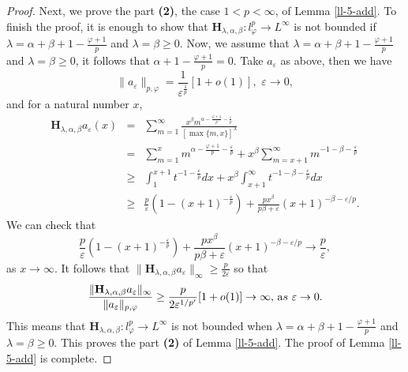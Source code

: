 \documentclass[10pt,a4paper]{amsart}
\begin{document}
\begin{proof}
Next, we prove the part {\bf (2)}, the case $1<p<\infty$, of Lemma \ref{ll-5-add}.  
To finish the proof, it is enough to show that $\mathbf{H}_{\lambda, \alpha, \beta}: l_{\varphi}^p \rightarrow L^{\infty}$ is not bounded if $\lambda=\alpha+\beta+1-\frac{\varphi+1}{p}$ and $\lambda=\beta\geq 0$. Now, we assume that
$\lambda=\alpha+\beta+1-\frac{\varphi+1}{p}$ and $\lambda=\beta\geq 0$, it follows that $\alpha+1-\frac{\varphi+1}{p}=0$.  Take $a_{\varepsilon}$ as above, then we have 
$$\|a_{\varepsilon}\|_{p, \varphi}=\frac{1}{{\varepsilon}^{\frac{1}{p}}}[1+o(1)],\,\, \varepsilon \rightarrow 0,$$ 
and for a natural number $x$,
 \begin{eqnarray}
\mathbf{H}_{\lambda, \alpha, \beta}a_{\varepsilon}(x)&=&\sum_{m=1}^{\infty}\frac{x^{\beta}m^{\alpha-\frac{\varphi+1}{p}-\frac{\varepsilon}{p}}}{[\max\{m,x\}]^{\lambda}}
\nonumber \\
&=&\sum_{m=1}^{x}m^{\alpha-\frac{\varphi+1}{p}-\frac{\varepsilon}{p}}+x^{\beta}\sum_{m=x+1}^{\infty}m^{-1-\beta-\frac{\varepsilon}{p}}
\nonumber \\
&\geq & \int_{1}^{x+1}t^{-1-\frac{\varepsilon}{p}}dx+x^{\beta}\int_{x+1}^{\infty}t^{-1-\beta-\frac{\varepsilon}{p}}dx\nonumber \\
&\geq & \frac{p}{\varepsilon}(1-(x+1)^{-\frac{\varepsilon}{p}})+\frac{px^{\beta}}{p\beta+\varepsilon}(x+1)^{-\beta-\varepsilon/p}.\nonumber 
\end{eqnarray} 
We can check that
$$\frac{p}{\varepsilon}(1-(x+1)^{-\frac{\varepsilon}{p}})+\frac{px^{\beta}}{p\beta+\varepsilon}(x+1)^{-\beta-\varepsilon/p}\to \frac{p}{\varepsilon},$$
as $x\to \infty$.  
It follows that $\|\mathbf{H}_{\lambda, \alpha, \beta}a_{\varepsilon}\|_{\infty}\geq \frac{p}{2\varepsilon}$ so that
\[\frac{\|\mathbf{H}_{\lambda, \alpha, \beta}a_{\varepsilon}\|_{\infty}}{\|a_{\varepsilon}\|_{p,\varphi}}\geq \frac{p}{2{\varepsilon}^{1/p'}}[1+o(1)]\to \infty,\,{\text as}\,\,\varepsilon \rightarrow 0.\]
This means that $\mathbf{H}_{\lambda, \alpha, \beta}: l_{\varphi}^p \rightarrow L^{\infty}$ is not bounded when $\lambda=\alpha+\beta+1-\frac{\varphi+1}{p}$ and $\lambda=\beta\geq 0$. This proves the part {\bf (2)} of Lemma \ref{ll-5-add}. The proof of Lemma \ref{ll-5-add} is complete. 
\end{proof}
\end{document}
